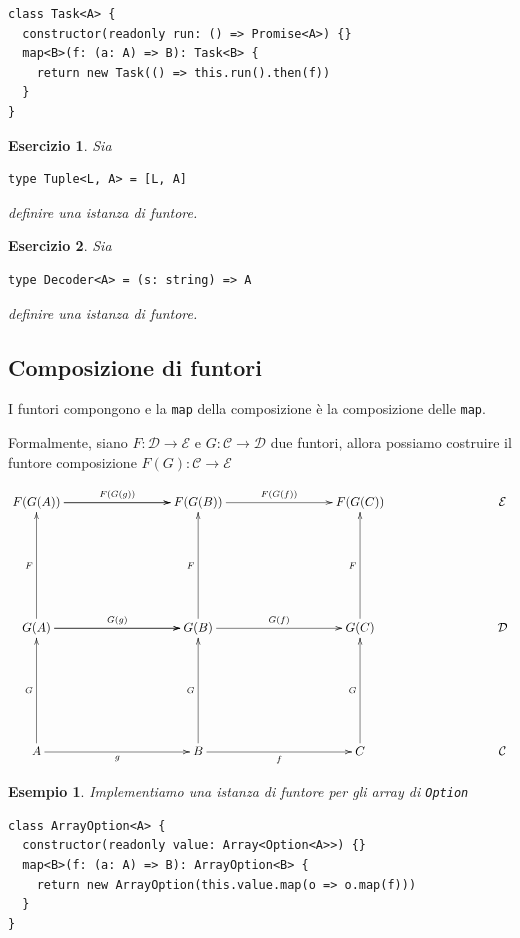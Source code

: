 \documentclass[12pt]{article}
\newtheorem{example}{Esempio}[section]
\newtheorem{exercise}{Esercizio}[section]
\begin{document}
\begin{verbatim}
class Task<A> {
  constructor(readonly run: () => Promise<A>) {}
  map<B>(f: (a: A) => B): Task<B> {
    return new Task(() => this.run().then(f))
  }
}
\end{verbatim}

\begin{exercise}
Sia

\begin{verbatim}
type Tuple<L, A> = [L, A]
\end{verbatim}

definire una istanza di funtore.
\end{exercise}

\begin{exercise}
Sia

\begin{verbatim}
type Decoder<A> = (s: string) => A
\end{verbatim}

definire una istanza di funtore.
\end{exercise}

\subsection{Composizione di funtori}

I funtori compongono e la \texttt{map} della composizione è la composizione delle \texttt{map}.

Formalmente, siano $F: \mathcal{D} \rightarrow \mathcal{E}$ e $G: \mathcal{C} \rightarrow \mathcal{D}$ due funtori,
allora possiamo costruire il funtore composizione $F(G): \mathcal{C} \rightarrow \mathcal{E}$

\[
\xymatrixrowsep{3cm}
\xymatrixcolsep{3cm}
\xymatrix{
  F(G(A)) \ar[r]^{F(G(g))} \ar[r] & F(G(B)) \ar[r]^{F(G(f))} & F(G(C)) & \mathcal{E} \\
  G(A) \ar[u]^F \ar[r]^{G(g)} \ar[r] & G(B) \ar[u]^F \ar[r]^{G(f)} & G(C) \ar[u]^F & \mathcal{D} \\
  A \ar[u]^G \ar[r]_g & B \ar[u]^G \ar[r]_f & C \ar[u]^G & \mathcal{C}
}
\]

\begin{example}
Implementiamo una istanza di funtore per gli array di \texttt{Option}

\begin{verbatim}
class ArrayOption<A> {
  constructor(readonly value: Array<Option<A>>) {}
  map<B>(f: (a: A) => B): ArrayOption<B> {
    return new ArrayOption(this.value.map(o => o.map(f)))
  }
}
\end{verbatim}
\end{example}
\end{document}

